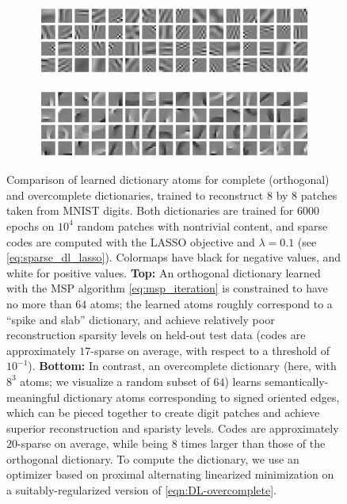 \documentclass[../../book-main.tex]{subfiles}
\begin{document}
\begin{figure}[t]
\centering
    \begin{subfigure}{0.9\linewidth}
        \centering
        \includegraphics[width=\linewidth]{figs_chap2/msp_atoms_patches_new.png}
        \caption{}
    \end{subfigure}
    \begin{subfigure}{0.9\linewidth}
        \centering
        \includegraphics[width=\linewidth]{figs_chap2/palm_atoms_patches_new.png}
        \caption{}
    \end{subfigure}
    \caption{Comparison of learned dictionary atoms for complete (orthogonal)
    and overcomplete dictionaries, trained to reconstruct $8$ by $8$ patches taken from
    MNIST digits. Both dictionaries are trained for $6000$ epochs on $10^4$ random patches with
    nontrivial content, and sparse codes are computed with the LASSO objective
    and $\lambda=0.1$ (see \eqref{eq:sparse_dl_lasso}). Colormaps have black for negative values, and white for
    positive values. \textbf{Top:} An orthogonal dictionary learned with the
    MSP algorithm \eqref{eq:msp_iteration} is constrained to
    have no more than $64$ atoms; the learned atoms roughly correspond to
    a ``spike and slab'' dictionary, and achieve relatively poor reconstruction sparsity
    levels on held-out test data (codes are approximately $17$-sparse on
    average, with respect to a threshold of $10^{-1}$).
    \textbf{Bottom:} In contrast, an overcomplete dictionary (here, with $8^3$
    atoms; we visualize a random subset of $64$) learns
    semantically-meaningful dictionary atoms corresponding to signed oriented
    edges, which can be pieced together to create digit patches and achieve
    superior reconstruction and sparisty levels. Codes are approximately
    $20$-sparse on
    average, while being $8$ times larger than those of the orthogonal
    dictionary. To compute the
    dictionary, we use an optimizer based on proximal alternating linearized
    minimization on a suitably-regularized version of
    \eqref{eqn:DL-overcomplete}.}
    \label{fig:ReconMNIST}
\end{figure}
\end{document}

